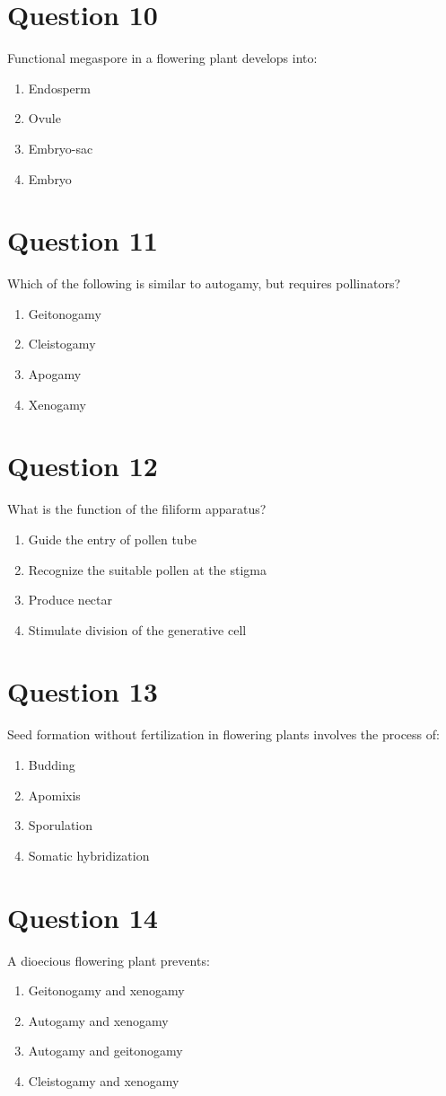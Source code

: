 \documentclass{article}
\begin{document}
\section*{Question 10}
Functional megaspore in a flowering plant develops into:
\begin{enumerate}[label=(\alph*)]
\item Endosperm
\item Ovule
\item Embryo-sac
\item Embryo
\end{enumerate}
\newpage
\section*{Question 11}
Which of the following is similar to autogamy, but requires pollinators?
\begin{enumerate}[label=(\alph*)]
\item Geitonogamy
\item Cleistogamy
\item Apogamy
\item Xenogamy
\end{enumerate}
\newpage
\section*{Question 12}
What is the function of the filiform apparatus?
\begin{enumerate}[label=(\alph*)]
\item Guide the entry of pollen tube
\item Recognize the suitable pollen at the stigma
\item Produce nectar
\item Stimulate division of the generative cell
\end{enumerate}
\newpage
\section*{Question 13}
Seed formation without fertilization in flowering plants involves the process of:\newline
\begin{enumerate}[label=(\alph*)]
\item Budding
\item Apomixis
\item Sporulation
\item Somatic hybridization
\end{enumerate}
\newpage
\section*{Question 14}
A dioecious flowering plant prevents:
\begin{enumerate}[label=(\alph*)]
\item Geitonogamy and xenogamy
\item Autogamy and xenogamy
\item Autogamy and geitonogamy
\item Cleistogamy and xenogamy
\end{enumerate}
\newpage
\end{document}
